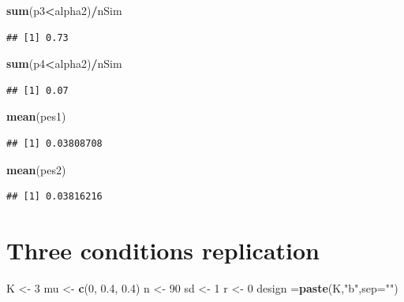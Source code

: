 \documentclass[]{book}
\newenvironment{Shaded}{\begin{snugshade}}{\end{snugshade}}
\newcommand{\DataTypeTok}[1]{\textcolor[rgb]{0.13,0.29,0.53}{#1}}
\newcommand{\DecValTok}[1]{\textcolor[rgb]{0.00,0.00,0.81}{#1}}
\newcommand{\FloatTok}[1]{\textcolor[rgb]{0.00,0.00,0.81}{#1}}
\newcommand{\KeywordTok}[1]{\textcolor[rgb]{0.13,0.29,0.53}{\textbf{#1}}}
\newcommand{\NormalTok}[1]{#1}
\newcommand{\OperatorTok}[1]{\textcolor[rgb]{0.81,0.36,0.00}{\textbf{#1}}}
\newcommand{\StringTok}[1]{\textcolor[rgb]{0.31,0.60,0.02}{#1}}
\begin{document}
\begin{Shaded}
\begin{Highlighting}[]
\KeywordTok{sum}\NormalTok{(p3}\OperatorTok{<}\NormalTok{alpha2)}\OperatorTok{/}\NormalTok{nSim}
\end{Highlighting}
\end{Shaded}

\begin{verbatim}
## [1] 0.73
\end{verbatim}

\begin{Shaded}
\begin{Highlighting}[]
\KeywordTok{sum}\NormalTok{(p4}\OperatorTok{<}\NormalTok{alpha2)}\OperatorTok{/}\NormalTok{nSim}
\end{Highlighting}
\end{Shaded}

\begin{verbatim}
## [1] 0.07
\end{verbatim}

\begin{Shaded}
\begin{Highlighting}[]
\KeywordTok{mean}\NormalTok{(pes1)}
\end{Highlighting}
\end{Shaded}

\begin{verbatim}
## [1] 0.03808708
\end{verbatim}

\begin{Shaded}
\begin{Highlighting}[]
\KeywordTok{mean}\NormalTok{(pes2)}
\end{Highlighting}
\end{Shaded}

\begin{verbatim}
## [1] 0.03816216
\end{verbatim}

\hypertarget{three-conditions-replication}{%
\section{Three conditions replication}\label{three-conditions-replication}}

\begin{Shaded}
\begin{Highlighting}[]
\NormalTok{K <-}\StringTok{ }\DecValTok{3}
\NormalTok{mu <-}\StringTok{ }\KeywordTok{c}\NormalTok{(}\DecValTok{0}\NormalTok{, }\FloatTok{0.4}\NormalTok{, }\FloatTok{0.4}\NormalTok{)}
\NormalTok{n <-}\StringTok{ }\DecValTok{90}
\NormalTok{sd <-}\StringTok{ }\DecValTok{1}
\NormalTok{r <-}\StringTok{ }\DecValTok{0}
\NormalTok{design =}\KeywordTok{paste}\NormalTok{(K,}\StringTok{"b"}\NormalTok{,}\DataTypeTok{sep=}\StringTok{""}\NormalTok{)}
\end{Highlighting}
\end{Shaded}
\end{document}
